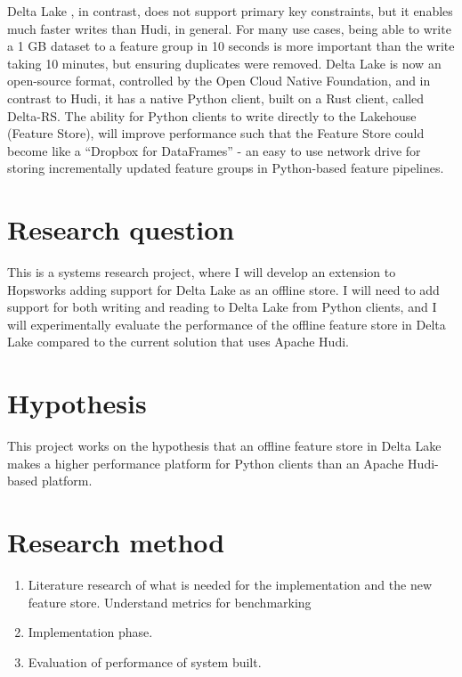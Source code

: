 \documentclass[12pt,twoside,english]{article}
\begin{document}
Delta Lake \cite{armbrustDeltaLakeHighperformance2020}, in contrast, does not support primary key constraints, but it enables much faster writes than Hudi, in general. For many use cases, being able to write a 1 GB dataset to a feature group in 10 seconds is more important than the write taking 10 minutes, but ensuring duplicates were removed. Delta Lake is now an open-source format, controlled by the Open Cloud Native Foundation, and in contrast to Hudi, it has a native Python client, built on a Rust client, called Delta-RS. The ability for Python clients to write directly to the Lakehouse (Feature Store), will improve performance such that the Feature Store could become like a “Dropbox for DataFrames” - an easy to use network drive for storing incrementally updated feature groups in Python-based feature pipelines.

\section{Research question}

This is a systems research project, where I will develop an extension to Hopsworks adding support for Delta Lake as an offline store. I will need to add support for both writing and reading to Delta Lake from Python clients, and I will experimentally evaluate the performance of the offline feature store in Delta Lake compared to the current solution that uses Apache Hudi.

\section{Hypothesis}

This project works on the hypothesis that an offline feature store in Delta Lake makes a higher performance platform for Python clients than an Apache Hudi-based platform.

\section{Research method}
\begin{enumerate}
    \item Literature research of what is needed for the implementation and the new feature store. Understand metrics for benchmarking
    \item Implementation phase.
    \item Evaluation of performance of system built.
\end{enumerate}
\end{document}
